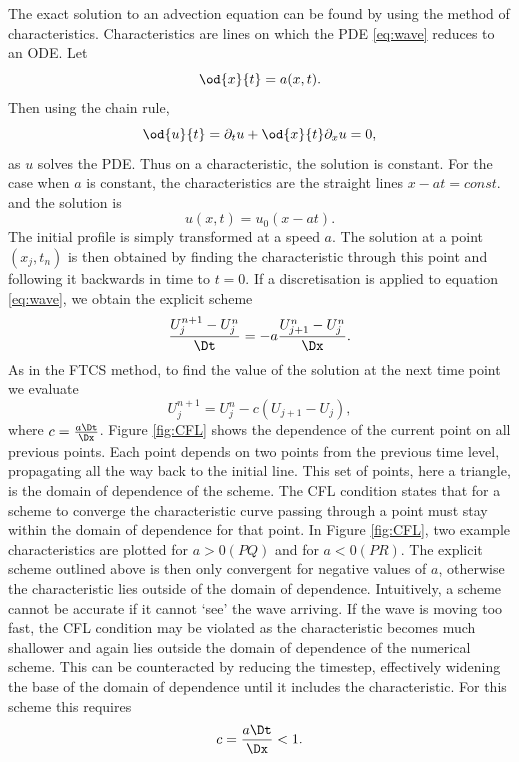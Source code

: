 The exact solution to an advection equation can be found by using the method of characteristics. Characteristics are lines on which the PDE \eqref{eq:wave} reduces to an ODE. Let 
\[\od{x}{t} = a(x,t).\]
Then using the chain rule,
\[
\od{u}{t} = \partial_t u +\od{x}{t}\partial_x u = 0,
\]
as $u$ solves the PDE. Thus on a characteristic, the solution is constant. For the case when $a$ is constant, the characteristics are the straight lines $x-at = const.$ and the solution is \[ u(x,t) = u_0(x-at).\] The initial profile is simply transformed at a speed $a$. The solution at a point $(x_j,t_n)$ is then obtained by finding the characteristic through this point and following it backwards in time to $t=0$. If a discretisation is applied to equation \eqref{eq:wave}, we obtain the explicit scheme
\[\frac{U^{n+1}_j-U^n_j}{\Dt} =-a \frac{U^n_{j+1}-U^n_j}{\Dx}.\] 
As in the FTCS method, to find the value of the solution at the next time point we evaluate
\[U^{n+1}_j = U^n_j - c(U_{j+1}-U_j), \]
where $c=\frac{a\Dt}{\Dx}$. Figure \ref{fig:CFL} shows the dependence of the current point on all previous points. Each point depends on two points from the previous time level, propagating all the way back to the initial line. This set of points, here a triangle, is the domain of dependence of the scheme. The CFL condition states that for a scheme to converge the characteristic curve passing through a point must stay within the domain of dependence for that point. In Figure \ref{fig:CFL}, two example characteristics are plotted for $a>0 (PQ)$ and for $a<0 (PR)$. The explicit scheme outlined above is then only convergent for negative values of $a$, otherwise the characteristic lies outside of the domain of dependence. Intuitively, a scheme cannot be accurate if it cannot `see' the wave arriving. If the wave is moving too fast, the CFL condition may be violated as the characteristic becomes much shallower and again lies outside the domain of dependence of the numerical scheme. This can be counteracted by reducing the timestep, effectively widening the base of the domain of dependence until it includes the characteristic. For this scheme this requires 
\[c =\frac{a\Dt}{\Dx} < 1.\]
